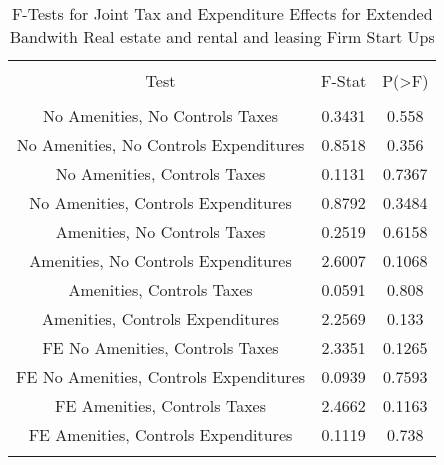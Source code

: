 
\begin{table}[!htbp] \centering 
  \caption{F-Tests for Joint Tax and Expenditure Effects for Extended Bandwith Real estate and rental and leasing Firm Start Ups} 
  \label{53Ftests} 
\begin{tabular}{@{\extracolsep{5pt}} ccc} 
\\[-1.8ex]\hline 
\hline \\[-1.8ex] 
Test & F-Stat & P(\textgreater F) \\ 
\hline \\[-1.8ex] 
No Amenities, No Controls Taxes & 0.3431 & 0.558 \\ 
No Amenities, No Controls Expenditures & 0.8518 & 0.356 \\ 
No Amenities, Controls Taxes & 0.1131 & 0.7367 \\ 
No Amenities, Controls Expenditures & 0.8792 & 0.3484 \\ 
Amenities, No Controls Taxes & 0.2519 & 0.6158 \\ 
Amenities, No Controls Expenditures & 2.6007 & 0.1068 \\ 
Amenities, Controls Taxes & 0.0591 & 0.808 \\ 
Amenities, Controls Expenditures & 2.2569 & 0.133 \\ 
FE No Amenities, Controls Taxes & 2.3351 & 0.1265 \\ 
FE No Amenities, Controls Expenditures & 0.0939 & 0.7593 \\ 
FE Amenities, Controls Taxes & 2.4662 & 0.1163 \\ 
FE Amenities, Controls Expenditures & 0.1119 & 0.738 \\ 
\hline \\[-1.8ex] 
\end{tabular} 
\end{table} 
